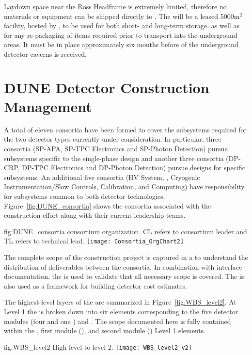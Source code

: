 Laydown space near the Ross Headframe is extremely 
limited, therefore  no materials or equipment can be shipped directly to . The  will be a leased 5000m$^2$ facility, hosted by 
, to be used for both short- and long-term storage, as 
well as for any re-packaging of items required prior to transport 
into the underground areas.  It must be in place approximately six months before 
of the underground detector caverns is received.  

\section{DUNE Detector Construction Management}
\label{sec:es-tc-det-mgmt}


A total of eleven  consortia have been formed to cover 
the subsystems required for the two detector types currently under
consideration.  In particular, three consortia (SP-APA, SP-TPC
Electronics and SP-Photon Detection) pursue subsystems specific to
the single-phase design and another three consortia (DP-CRP, DP-TPC
Electronics and DP-Photon Detection) pursue designs for 
specific subsystems.  An additional five consortia (HV System, ,
Cryogenic Instrumentation/Slow Controls, Calibration, and Computing)
have responsibility for subsystems common to both detector
technologies.  Figure~\ref{fig:DUNE_consortia} shows the consortia 
associated with the  construction effort along with their 
current leadership teams.  
\begin{dunefigure}{fig:DUNE_consortia}
  { consortium organization. CL refers to consortium leader
    and TL refers to technical lead.}
  \texttt{[image: Consortia\_OrgChart2]}
\end{dunefigure}

The complete scope of the  construction project is captured in a 
 to understand the distribution of deliverables between 
the consortia.  In combination with interface documentation, the 
 is used to validate that all necessary scope is covered.  The 
 is also used as a framework for building  
detector cost estimates. 

The highest-level layers of the   are summarized 
in Figure~\ref{fig:WBS_level2}.  At Level 1 the  is broken down into 
six elements corresponding to the five  detector modules (four 
 and one ) and .  The scope documented
here is fully contained within the , first  module 
(), and second  module () Level 1 elements.   
\begin{dunefigure}{fig:WBS_level2}
  {High-level   to level 2.}
  \texttt{[image: WBS\_level2\_v2]}
\end{dunefigure}

